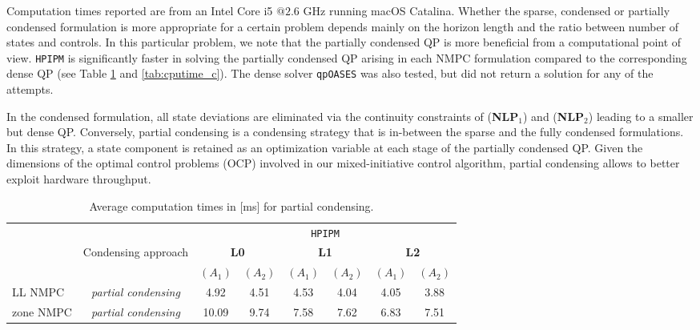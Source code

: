 Computation times reported are from an Intel Core i5 $@2.6$ GHz running macOS Catalina. Whether the sparse, condensed or partially condensed formulation is more appropriate for a certain problem depends mainly on the horizon length and the ratio between number of states and controls. In this particular problem, we note that the partially condensed QP is more beneficial from a computational point of view. \texttt{HPIPM} is significantly faster in solving the partially condensed QP arising in each NMPC formulation compared to the corresponding dense QP (see Table \ref{tab:cputime_pc} and \ref{tab:cputime_c}). The dense solver \texttt{qpOASES} was also tested, but did not return a solution for any of the attempts.

In the condensed formulation, all state deviations are eliminated via the continuity constraints of (\textbf{NLP$_1$}) and (\textbf{NLP$_2$}) leading to a smaller but dense QP. Conversely, partial condensing is a condensing strategy that is in-between the sparse and the fully condensed formulations. In this strategy, a state component is retained as an optimization variable at each stage of the partially condensed QP. Given the dimensions of the optimal control problems (OCP) involved in our mixed-initiative control algorithm, partial condensing allows to better exploit hardware throughput.

\begin{table}[h]
\caption{Average computation times in [ms] for partial condensing.}
\begin{tabular}{lccccccc}
\toprule
\multirow{2}[3]{*}{} & & \multicolumn{2}{c}{} & \multicolumn{2}{c}{\texttt{HPIPM}}\\
\cmidrule(lr){3-8}
 & \multirow{2}[3]{*}{Condensing approach} & \multicolumn{2}{c}{\textbf{L0}} & \multicolumn{2}{c}{\textbf{L1}} & \multicolumn{2}{c}{\textbf{L2}}\\
\cmidrule(lr){3-4} \cmidrule(lr){5-6} \cmidrule(lr){7-8}
 & & $(A_1)$ & $(A_2)$ & $(A_1)$ & $(A_2)$ & $(A_1)$ & $(A_2)$\\
\midrule
LL NMPC\footnotemark & \textit{partial condensing} & 4.92 & 4.51 & 4.53 & 4.04 & 4.05 & 3.88 \\
\midrule
zone NMPC & \textit{partial condensing} & 10.09 & 9.74 & 7.58 & 7.62 & 6.83 & 7.51 \\
\bottomrule
\end{tabular}\label{tab:cputime_pc}
\end{table}

